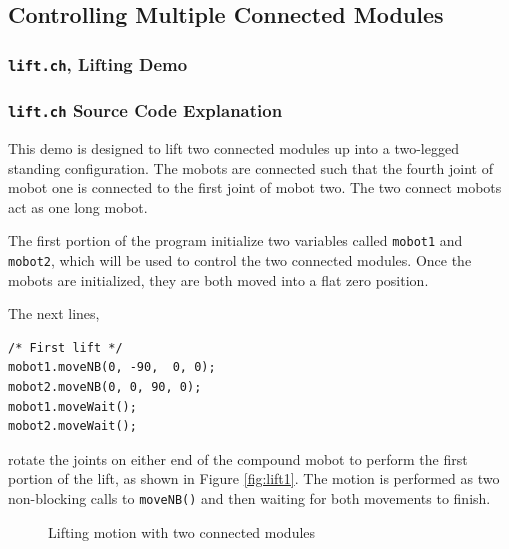 \documentclass{article}
\begin{document}
\subsection{Controlling Multiple Connected Modules}
\subsubsection{\texttt{lift.ch}, Lifting Demo}

\subsubsection{\texttt{lift.ch} Source Code Explanation}
This demo is designed to lift two connected modules up into
a two-legged standing configuration. The mobots are connected such that the fourth
joint of mobot one is connected to the first joint of mobot two. The two connect mobots
act as one long mobot.

The first portion of the program initialize two variables called \texttt{mobot1} 
and \texttt{mobot2}, which will be used to control the two connected modules.
Once the mobots are initialized, they are both moved into a flat zero position.

The next lines,
\begin{verbatim}
/* First lift */
mobot1.moveNB(0, -90,  0, 0);
mobot2.moveNB(0, 0, 90, 0);
mobot1.moveWait();
mobot2.moveWait();
\end{verbatim}
rotate the joints on either end of the compound mobot to perform the 
first portion of the lift, as shown in Figure \ref{fig:lift1}. The motion is performed as two non-blocking
calls to \texttt{moveNB()} and then waiting for both movements to finish.

\begin{figure}
  \centering
  \caption{Lifting motion with two connected modules}
  \label{fig:lift}
\end{figure}
\end{document}
